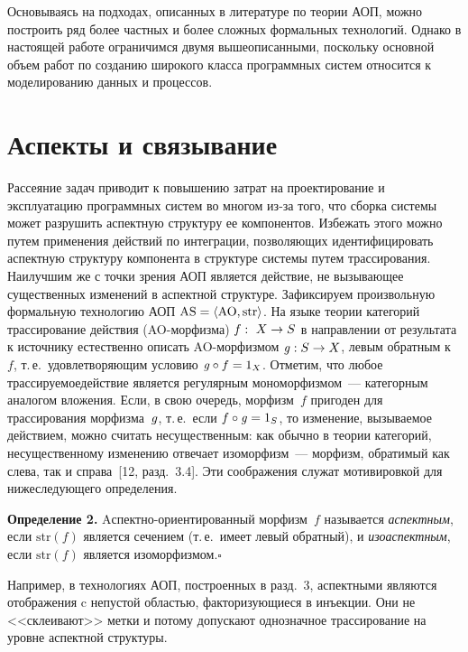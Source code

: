 \begin{multicols}{2}
   Основываясь на подходах, описанных в литературе по теории АОП, можно 
построить ряд более частных и более сложных формальных технологий. 
Однако в настоящей работе ограничимся двумя вышеописанными, поскольку 
основной объем работ по созданию широкого класса программных систем 
относится к моделированию данных и процессов.

\section{Аспекты и связывание}

   Рассеяние задач приводит к повышению затрат на проектирование и 
эксплуатацию программных систем во многом из-за того, что сборка системы может 
разрушить аспектную структуру ее компонентов. Избежать этого можно путем 
применения действий по интеграции, позволяющих идентифицировать аспектную 
структуру компонента в структуре системы путем трассирования. Наилучшим же с 
точки зрения АОП является действие, не вызывающее существенных изменений в 
аспектной структуре. Зафиксируем произвольную формальную технологию АОП $\mathrm{AS} 
\hm= \langle \mathrm{AO}, \mathrm{str}\rangle$. На языке теории категорий трассирование действия 
(AO-мор\-физ\-ма) $f:\ X\hm\rightarrow S$ в направлении от результата к 
источнику естественно описать AO-мор\-физ\-мом $\g: S \hm\rightarrow X$, 
левым обратным к~$f$, т.\,е.\ удовлетворяющим условию $\g\circ f \hm = 1_X$. 
Отметим, что любое трассируемое\linebreak действие является регулярным мономорфизмом~--- 
категорным аналогом вложения. Если, в свою \mbox{очередь}, морфизм~$f$ пригоден для 
трассирования морфизма~$\mbox{\textit{g}}$, т.\,е.\ если $f\circ\g \hm= 1_S$, то изменение, 
вызываемое действием, можно считать несущественным: как обычно в теории 
категорий, несущественному изменению отвечает изоморфизм~--- морфизм, обратимый 
как слева, так и справа~[12, разд.~3.4]. Эти соображения служат мотивировкой 
для нижеследующего определения.
  
  \medskip
  
  \noindent
  \textbf{Определение 2.} Aспектно-ориентированный мор\-физм~$f$ называется \textit{аспектным}, 
если $\mathrm{str}(f)$ является сечением (т.\,е.\ имеет левый обратный), и 
\textit{изоаспектным}, если $\mathrm{str}(f)$ является изоморфизмом.\hfill$\square$
   
   \medskip
   
   Например, в технологиях АОП, построенных в разд.~3, аспектными являются 
отображения c непустой областью, факторизующиеся в инъекции. Они не 
<<склеивают>> метки и потому допускают однозначное трассирование на 
уровне аспектной структуры.
   

\end{multicols}
